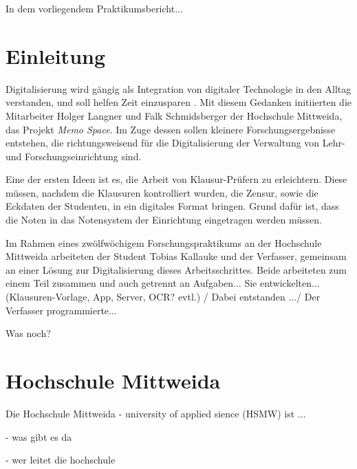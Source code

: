 \documentclass[nomenclature, 150]{HSMW-Thesis}
\begin{document}
\begin{Referat}
In dem vorliegendem Praktikumsbericht...

\end{Referat}


\Hauptteil


\chapter{Einleitung}
	Digitalisierung wird gängig als Integration von digitaler Technologie in den Alltag verstanden, und soll helfen Zeit einzusparen \cite{digital}. Mit diesem Gedanken initiierten die Mitarbeiter Holger Langner und Falk Schmidsberger der Hochschule Mittweida, das Projekt \textit{Memo Space}. Im Zuge dessen sollen kleinere Forschungsergebnisse entstehen, die richtungsweisend für die Digitalisierung der Verwaltung von Lehr- und Forschungseinrichtung sind.

	Eine der ersten Ideen ist es, die Arbeit von Klausur-Prüfern zu erleichtern. Diese müssen, nachdem die Klausuren kontrolliert wurden, die Zensur, sowie die Eckdaten der Studenten, in ein digitales Format bringen. Grund dafür ist, dass die Noten in das Notensystem der Einrichtung eingetragen werden müssen. 

	Im Rahmen eines zwölfwöchigem Forschungspraktikums an der Hochschule Mittweida arbeiteten der Student Tobias Kallauke und der Verfasser, gemeinsam an einer Lösung zur Digitalisierung dieses Arbeitsschrittes. Beide arbeiteten zum einem Teil zusammen und auch getrennt an Aufgaben... Sie entwickelten... (Klausuren-Vorlage, App, Server, OCR? evtl.) / Dabei entstanden .../ Der Verfasser programmierte...
	
	Was noch? 

\chapter{Hochschule Mittweida}
	Die Hochschule Mittweida - university of applied sience (HSMW)  ist ...
	
	- was gibt es da
	
	- wer leitet die hochschule
	
\end{document}
